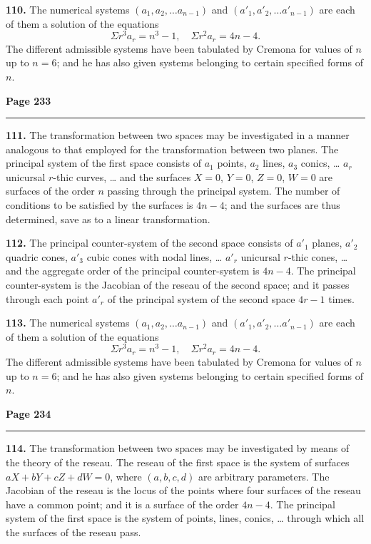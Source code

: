 \documentclass[12pt,a4paper]{article}
\theoremstyle{plain}
\theoremstyle{definition}
\theoremstyle{remark}
\begin{document}
\textbf{110.} The numerical systems $(a_1, a_2, \ldots a_{n-1})$ and $(a'_1, a'_2, \ldots a'_{n-1})$ are each of them a solution of the equations
\[
\Sigma r^3 a_r = n^3 - 1, \quad \Sigma r^2 a_r = 4n - 4.
\]
The different admissible systems have been tabulated by Cremona for values of $n$ up to $n = 6$; and he has also given systems belonging to certain specified forms of $n$.

\newpage
\noindent\textbf{Page 233}\\
\noindent\rule{\textwidth}{0.4pt}

\smallskip

\noindent\textbf{111.} The transformation between two spaces may be investigated in a manner analogous to that employed for the transformation between two planes. The principal system of the first space consists of $a_1$ points, $a_2$ lines, $a_3$ conics, \ldots{} $a_r$ unicursal $r$-thic curves, \ldots{} and the surfaces $X = 0$, $Y = 0$, $Z = 0$, $W = 0$ are surfaces of the order $n$ passing through the principal system. The number of conditions to be satisfied by the surfaces is $4n - 4$; and the surfaces are thus determined, save as to a linear transformation.

\textbf{112.} The principal counter-system of the second space consists of $a'_1$ planes, $a'_2$ quadric cones, $a'_3$ cubic cones with nodal lines, \ldots{} $a'_r$ unicursal $r$-thic cones, \ldots{} and the aggregate order of the principal counter-system is $4n - 4$. The principal counter-system is the Jacobian of the reseau of the second space; and it passes through each point $a'_r$ of the principal system of the second space $4r - 1$ times.

\textbf{113.} The numerical systems $(a_1, a_2, \ldots a_{n-1})$ and $(a'_1, a'_2, \ldots a'_{n-1})$ are each of them a solution of the equations
\[
\Sigma r^3 a_r = n^3 - 1, \quad \Sigma r^2 a_r = 4n - 4.
\]
The different admissible systems have been tabulated by Cremona for values of $n$ up to $n = 6$; and he has also given systems belonging to certain specified forms of $n$.

\newpage
\noindent\textbf{Page 234}\\
\noindent\rule{\textwidth}{0.4pt}

\smallskip

\noindent\textbf{114.} The transformation between two spaces may be investigated by means of the theory of the reseau. The reseau of the first space is the system of surfaces $aX + bY + cZ + dW = 0$, where $(a, b, c, d)$ are arbitrary parameters. The Jacobian of the reseau is the locus of the points where four surfaces of the reseau have a common point; and it is a surface of the order $4n - 4$. The principal system of the first space is the system of points, lines, conics, \ldots{} through which all the surfaces of the reseau pass.
\end{document}
